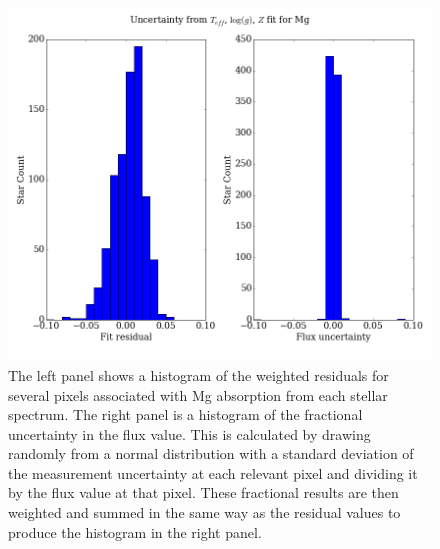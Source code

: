 \documentclass[preprint]{aastex}
\begin{document}
\begin{figure}%
\centering
\includegraphics[width = \linewidth]{Mg_residuals.png}
\caption{The left panel shows a histogram of the weighted residuals for several pixels associated with Mg absorption from each stellar spectrum. The right panel is a histogram of the fractional uncertainty in the flux value. This is calculated by drawing randomly from a normal distribution with a standard deviation of the measurement uncertainty at each relevant pixel and dividing it by the flux value at that pixel. These fractional results are then weighted and summed in the same way as the residual values to produce the histogram in the right panel.}
\label{fig:resid}
\end{figure}







\end{document}
